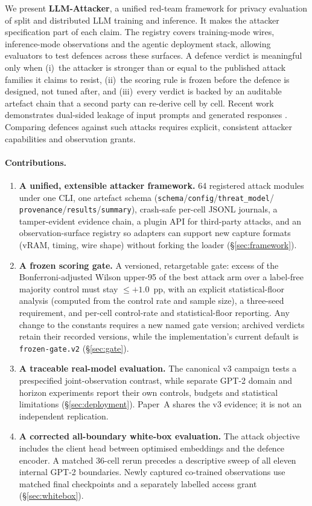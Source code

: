 \documentclass[11pt]{article}
\newcommand{\pp}{pp}
\begin{document}
We present \textbf{LLM-Attacker}, a unified red-team framework for privacy
evaluation of split and distributed LLM training and inference. It makes
the attacker specification part of each claim. The registry covers
training-mode wires, inference-mode observations and the agentic deployment
stack, allowing evaluators to test defences across these surfaces. A defence verdict
is meaningful only when (i)~the attacker is stronger than or equal to the
published attack families it claims to resist, (ii)~the scoring rule is
frozen before the defence is designed, not tuned after, and (iii)~every
verdict is backed by an auditable artefact chain that a second party can
re-derive cell by cell. Recent work demonstrates dual-sided leakage of input prompts and generated responses \cite{gu2026pidi}. Comparing defences against such attacks requires explicit, consistent attacker capabilities and observation grants.

\newpage
\paragraph{Contributions.}
\begin{enumerate}
\item \textbf{A unified, extensible attacker framework.}
  64 registered attack modules under one CLI, one artefact schema
  (\texttt{schema}/\texttt{config}/\texttt{threat\_model}/
  \texttt{provenance}/\texttt{results}/\texttt{summary}), crash-safe
  per-cell JSONL journals, a tamper-evident evidence chain, a plugin API
  for third-party attacks, and an observation-surface registry so adapters can support new
  capture formats (vRAM, timing, wire shape) without forking the loader
  (\S\ref{sec:framework}).
\item \textbf{A frozen scoring gate.}
  A versioned, retargetable gate: excess of the
  Bonferroni-adjusted Wilson upper-95 of the best attack arm over a
  label-free majority control must stay $\le +1.0$~\pp, with an explicit
  statistical-floor analysis (computed from the control rate and sample size), a three-seed requirement, and per-cell control-rate and statistical-floor reporting. Any change to the constants requires a new named gate version;
  archived verdicts retain their recorded versions, while the implementation's current default is \texttt{frozen-gate.v2} (\S\ref{sec:gate}).
\item \textbf{A traceable real-model evaluation.}
The canonical v3 campaign tests a prespecified joint-observation contrast, while separate GPT-2 domain and horizon experiments report their own controls, budgets and statistical limitations (\S\ref{sec:deployment}). Paper~A shares the v3 evidence; it is not an independent replication.
\item \textbf{A corrected all-boundary white-box evaluation.}
The attack objective includes the client head between optimised embeddings and the defence encoder. A matched 36-cell rerun precedes a descriptive sweep of all eleven internal GPT-2 boundaries. Newly captured co-trained observations use matched final checkpoints and a separately labelled access grant (\S\ref{sec:whitebox}).
\end{enumerate}
\end{document}
